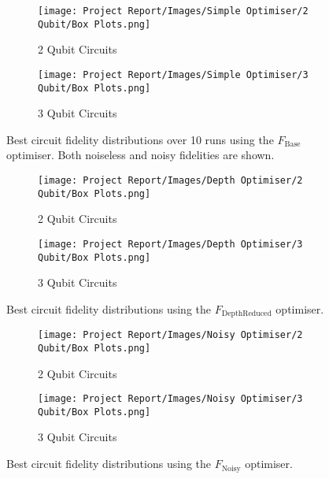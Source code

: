 \documentclass[11pt,a4paper]{article}
\begin{document}
\begin{figure}[H]
\centering
\begin{subfigure}{.5\textwidth}
  \centering
  \texttt{[image: Project Report/Images/Simple Optimiser/2 Qubit/Box Plots.png]}
  \caption{2 Qubit Circuits}
  \label{fig:simple_box_2q}
\end{subfigure}%
\begin{subfigure}{.5\textwidth}
  \centering
  \texttt{[image: Project Report/Images/Simple Optimiser/3 Qubit/Box Plots.png]}
  \caption{3 Qubit Circuits}
  \label{fig:simple_box_3q}
\end{subfigure}
\caption{Best circuit fidelity distributions over 10 runs using the $F_{\mathrm{Base}}$ optimiser. Both noiseless and noisy fidelities are shown.}
\label{fig:simple_box_plots}
\end{figure}

\begin{figure}[H]
\centering
\begin{subfigure}{.5\textwidth}
  \centering
  \texttt{[image: Project Report/Images/Depth Optimiser/2 Qubit/Box Plots.png]}
  \caption{2 Qubit Circuits}
  \label{fig:depth_box_2q}
\end{subfigure}%
\begin{subfigure}{.5\textwidth}
  \centering
  \texttt{[image: Project Report/Images/Depth Optimiser/3 Qubit/Box Plots.png]}
  \caption{3 Qubit Circuits}
  \label{fig:depth_box_3q}
\end{subfigure}
\caption{Best circuit fidelity distributions using the $F_{\mathrm{DepthReduced}}$ optimiser.}
\label{fig:depth_box_plots}
\end{figure}

\begin{figure}[H]
\centering
\begin{subfigure}{.5\textwidth}
  \centering
  \texttt{[image: Project Report/Images/Noisy Optimiser/2 Qubit/Box Plots.png]}
  \caption{2 Qubit Circuits}
  \label{fig:noisy_box_2q}
\end{subfigure}%
\begin{subfigure}{.5\textwidth}
  \centering
  \texttt{[image: Project Report/Images/Noisy Optimiser/3 Qubit/Box Plots.png]}
  \caption{3 Qubit Circuits}
  \label{fig:noisy_box_3q}
\end{subfigure}
\caption{Best circuit fidelity distributions using the $F_{\mathrm{Noisy}}$ optimiser.}
\label{fig:noisy_box_plots}
\end{figure}
\end{document}
